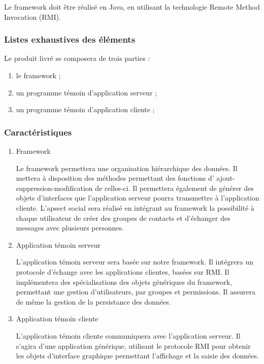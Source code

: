 Le framework doit être réalisé en Java, en utilisant la technologie Remote Method Invocation (RMI).

\subsubsection{Listes exhaustives des éléments} 
Le produit livré se composera de trois parties :
\begin{enumerate}
 \item le framework ;
 \item un programme témoin d'application serveur ;
 \item un programme témoin d'application cliente ;
\end{enumerate}

\subsubsection{Caractéristiques}
\begin{enumerate}
 \item Framework

Le framework permettera une organisation hiérarchique des données.
Il mettera à disposition des méthodes permettant des fonctions d' ajout-suppression-modification de celles-ci.
Il permettera également de générer des objets d'interfaces que l'application serveur pourra transmettre à l'application cliente.
L'apsect social sera réalisé en intégrant au framework la possibilité à chaque utilisateur de créer des groupes de contacts et d'échanger des messages avec plusieurs personnes.

 \item Application témoin serveur

L'application témoin serveur sera basée sur notre framework.
Il intégrera un protocole d'échange avec les applications clientes, basées sur RMI.
Il implémentera des spécialisations des objets génériques du framework, permettant une gestion d'utilisateurs, par groupes et permissions.
Il assurera de même la gestion de la persistance des données.

 \item Application témoin cliente

L'application témoin cliente communiquera avec l'application serveur.
Il s'agira d'une application générique, utilisant le protocole RMI pour obtenir les objets
d'interface graphique permettant l'affichage et la saisie des données.
\end{enumerate}
